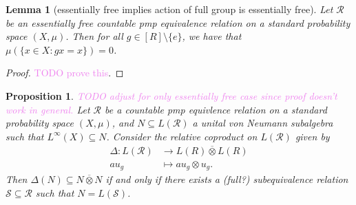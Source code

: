 \documentclass[12pt,letterpaper]{article}
\newcommand{\sub}{\subseteq}
\newcommand*\cls[1]{\overline{#1}}
\theoremstyle{definition}
\theoremstyle{plain}
\newtheorem{lemma}{Lemma}[]
\newtheorem{proposition}{Proposition}[]
\theoremstyle{remark}
\begin{document}
\begin{lemma}[essentially free implies action of full group is essentially free]
    Let $ \mathcal{R} $ be an essentially free countable pmp equivalence relation on a standard probability space $ (X,\mu) $. Then for all $ g\in [R]\setminus \{e\} $, we have that $ \mu(\{x\in X: gx = x\}) = 0 $.
\end{lemma}

\begin{proof}
    \textcolor{violet}{TODO prove this}.
\end{proof}

\begin{proposition}
    \textcolor{violet}{TODO adjust for only essentially free case since proof doesn't work in general.}
    Let $ \mathcal{R} $ be a countable pmp equivlence relation on a standard probability space $ (X,\mu) $, and $ N\sub L(\mathcal{R}) $ a unital von Neumann subalgebra such that $ L^{\infty}(X)\sub N $. Consider the relative coproduct on $ L(\mathcal{R}) $ given by
    \begin{align*}
        \Delta : L(\mathcal{R})&\to L(R)\cls{\otimes}L(R)\\
        au_{g} &\mapsto au_{g}\otimes u_{g}.
    \end{align*}
    Then $ \Delta (N)\sub N \cls{\otimes} N $ if and only if there exists a (full?) subequivalence relation $ \mathcal{S}\sub \mathcal{R} $ such that $ N = L(\mathcal{S}) $.
\end{proposition}
\end{document}
